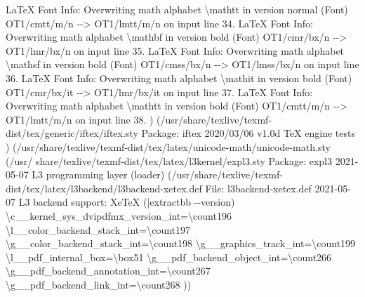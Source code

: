 \documentclass[
  letterpaper,
  DIV=11,
  numbers=noendperiod]{scrartcl}
\newenvironment{Shaded}{\begin{snugshade}}{\end{snugshade}}
\newcommand{\NormalTok}[1]{\textcolor[rgb]{0.00,0.23,0.31}{#1}}
\begin{document}
\begin{Shaded}
\begin{Highlighting}[]
\NormalTok{LaTeX Font Info:    Overwriting math alphabet \textasciigrave{}\textbackslash{}mathtt\textquotesingle{} in version \textasciigrave{}normal\textquotesingle{}}
\NormalTok{(Font)                  OT1/cmtt/m/n {-}{-}\textgreater{} OT1/lmtt/m/n on input line 34.}
\NormalTok{LaTeX Font Info:    Overwriting math alphabet \textasciigrave{}\textbackslash{}mathbf\textquotesingle{} in version \textasciigrave{}bold\textquotesingle{}}
\NormalTok{(Font)                  OT1/cmr/bx/n {-}{-}\textgreater{} OT1/lmr/bx/n on input line 35.}
\NormalTok{LaTeX Font Info:    Overwriting math alphabet \textasciigrave{}\textbackslash{}mathsf\textquotesingle{} in version \textasciigrave{}bold\textquotesingle{}}
\NormalTok{(Font)                  OT1/cmss/bx/n {-}{-}\textgreater{} OT1/lmss/bx/n on input line 36.}
\NormalTok{LaTeX Font Info:    Overwriting math alphabet \textasciigrave{}\textbackslash{}mathit\textquotesingle{} in version \textasciigrave{}bold\textquotesingle{}}
\NormalTok{(Font)                  OT1/cmr/bx/it {-}{-}\textgreater{} OT1/lmr/bx/it on input line 37.}
\NormalTok{LaTeX Font Info:    Overwriting math alphabet \textasciigrave{}\textbackslash{}mathtt\textquotesingle{} in version \textasciigrave{}bold\textquotesingle{}}
\NormalTok{(Font)                  OT1/cmtt/m/n {-}{-}\textgreater{} OT1/lmtt/m/n on input line 38.}
\NormalTok{) (/usr/share/texlive/texmf{-}dist/tex/generic/iftex/iftex.sty}
\NormalTok{Package: iftex 2020/03/06 v1.0d TeX engine tests}
\NormalTok{) (/usr/share/texlive/texmf{-}dist/tex/latex/unicode{-}math/unicode{-}math.sty (/usr/}
\NormalTok{share/texlive/texmf{-}dist/tex/latex/l3kernel/expl3.sty}
\NormalTok{Package: expl3 2021{-}05{-}07 L3 programming layer (loader) }
\NormalTok{(/usr/share/texlive/texmf{-}dist/tex/latex/l3backend/l3backend{-}xetex.def}
\NormalTok{File: l3backend{-}xetex.def 2021{-}05{-}07 L3 backend support: XeTeX}
\NormalTok{(|extractbb {-}{-}version)}
\NormalTok{\textbackslash{}c\_\_kernel\_sys\_dvipdfmx\_version\_int=\textbackslash{}count196}
\NormalTok{\textbackslash{}l\_\_color\_backend\_stack\_int=\textbackslash{}count197}
\NormalTok{\textbackslash{}g\_\_color\_backend\_stack\_int=\textbackslash{}count198}
\NormalTok{\textbackslash{}g\_\_graphics\_track\_int=\textbackslash{}count199}
\NormalTok{\textbackslash{}l\_\_pdf\_internal\_box=\textbackslash{}box51}
\NormalTok{\textbackslash{}g\_\_pdf\_backend\_object\_int=\textbackslash{}count266}
\NormalTok{\textbackslash{}g\_\_pdf\_backend\_annotation\_int=\textbackslash{}count267}
\NormalTok{\textbackslash{}g\_\_pdf\_backend\_link\_int=\textbackslash{}count268}
\NormalTok{))}

\end{Highlighting}
\end{Shaded}
\end{document}
